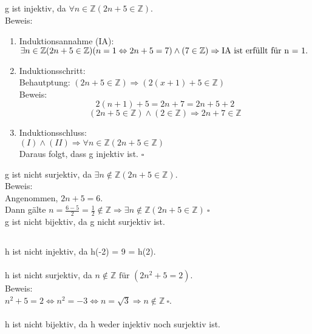 \documentclass[fleqn]{article}
\newcommand{\Z}{\mathbb{Z}}
\begin{document}
\subsection{}
g ist injektiv, da $\forall n \in \Z (2n + 5 \in \Z)$.\\
Beweis:\\
\begin{enumerate}[I]
    \item Induktionsannahme (IA): $\exists n \in \Z (2n + 5 \in \Z)\\
        (n=1 \Leftrightarrow 2n + 5 = 7) \wedge (7 \in \Z) \Rightarrow \text{IA ist erfüllt für n = 1.}$
    \item Induktionsschritt:\\
        Behautptung: $(2n + 5 \in \Z) \Rightarrow (2(x+1) + 5 \in \Z)$\\
        Beweis:
        \[
            2(n+1) + 5 = 2n +7 = 2n + 5 + 2
        \]\[
            (2n + 5 \in \Z) \wedge (2 \in \Z) \Rightarrow 2n + 7 \in \Z
        \]
    \item Induktionsschluss:\\
        $(I) \wedge (II) \Rightarrow \forall n \in \Z (2n + 5 \in \Z)$\\
        Daraus folgt, dass g injektiv ist. $\square$
\end{enumerate}

g ist nicht surjektiv, da $\exists n \notin \Z (2n + 5 \in \Z)$.\\
Beweis:\\
Angenommen, $2n + 5 = 6$.\\
Dann gälte $n = \frac{6-5}{2} = \frac{1}{2} \notin \Z \Rightarrow \exists n \notin \Z (2n + 5 \in \Z)~ \square$
\\
g ist nicht bijektiv, da g nicht surjektiv ist.

\subsection{}
h ist nicht injektiv, da h(-2) = 9 = h(2).\\
\\
h ist nicht surjektiv, da $n \notin \Z \text{ für } (2n^2 + 5 = 2)$.\\
Beweis:\\
$n^2 + 5 = 2 \Leftrightarrow n^2 = -3 \Leftrightarrow n = \sqrt{3} \Rightarrow n \notin \Z~\square$.\\
\\
h ist nicht bijektiv, da h weder injektiv noch surjektiv ist.
\section{}
\end{document}
